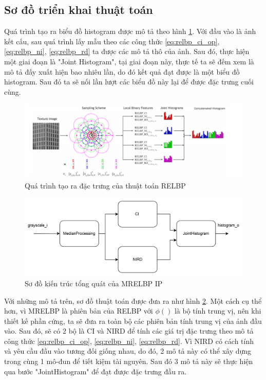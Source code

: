 \subsection{Sơ đồ triển khai thuật toán}
Quá trình tạo ra biểu đồ histogram được mô tả theo hình \ref{fig:histogramStep}. Với đầu vào là ảnh kết cấu, sau quá trình lấy mẫu theo các công thức \ref{eq:relbp_ci_op}, \ref{eq:relbp_ni}, \ref{eq:relbp_rd} ta được các mô tả thô của ảnh. Sau đó, thực hiện một giai đoạn là "Joint Histogram", tại giai đoạn này, thực tế ta sẽ đếm xem là mô tả đấy xuất hiện bao nhiêu lần, do đó kết quả đạt được là một biểu đồ histogram. Sau đó ta sẽ nối lần lượt các biểu đồ này lại để được đặc trưng cuối cùng. 

\begin{figure} [!ht]
	\centering
	\includegraphics[width= 1\linewidth]{figures/histogramStep.png}
	\caption{Quá trình tạo ra đặc trưng của thuật toán RELBP \cite{realTimeTexture}}
	\label{fig:histogramStep}
\end{figure} 


\begin{figure} [!ht]
	\centering
	\includegraphics[width= 1\linewidth]{figures/fullArch.png}
	\caption{Sơ đồ kiến trúc tổng quát của MRELBP IP}
	\label{fig:fullArch}
\end{figure} 


Với những mô tả trên, sơ đồ thuật toán được đưa ra như hình \ref{fig:fullArch}. Một cách cụ thể hơn, vì MRELBP là phiên bản của RELBP với $\phi()$ là bộ tính trung vị, nên khi thiết kế phần cứng, ta sẽ đưa ra toàn bộ các phiên bản tính trung vị của ảnh đầu vào. Sau đó, sẽ có 2 bộ là CI và NIRD để tính các giá trị đặc trưng theo mô tả công thức \ref{eq:relbp_ci_op}, \ref{eq:relbp_ni}, \ref{eq:relbp_rd}. Vì NIRD có cách tính và yêu cầu đầu vào tương đối giống nhau, do đó, 2 mô tả này có thể xây dựng trong cùng 1 mô-đun để tiết kiệm tài nguyên. Sau đó 3 mô tả này sẽ thực hiện qua bước "JointHistogram" để đạt được đặc trưng đầu ra.


